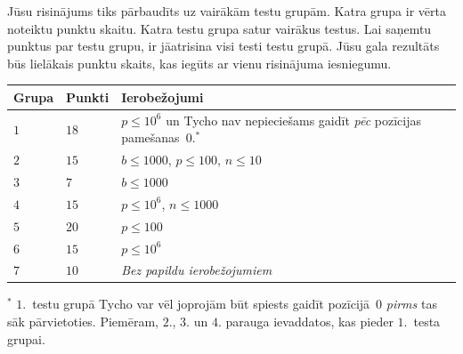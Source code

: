 Jūsu risinājums tiks pārbaudīts uz vairākām testu grupām. Katra grupa ir vērta noteiktu punktu skaitu.
Katra testu grupa satur vairākus testus.
Lai saņemtu punktus par testu grupu, ir jāatrisina visi testi testu grupā.
Jūsu gala rezultāts būs lielākais punktu skaits, kas iegūts ar vienu risinājuma iesniegumu.

\medskip
\begin{tabular}{lll}
  Grupa & Punkti & Ierobežojumi\\\hline
  $1$ & $18$  & $p\leq 10^6$ un Tycho nav nepieciešams gaidīt \emph{pēc} pozīcijas pamešanas~$0$.$^*$ \\ %
  $2$ & $15$  & $b\leq 1000$, $p\leq 100$, $n\leq 10$ \\
  $3$ & $7$  & $b\leq 1000$ \\
  $4$ & $15$ & $p\leq 10^6$, $n\leq 1000$\\
  $5$ & $20$ & $p\leq 100$\\
  $6$ & $15$ & $p\leq 10^6$\\
  $7$ & $10$ & \emph{Bez papildu ierobežojumiem}
\end{tabular}

\medskip
\noindent $^*$ $1$.~testu grupā Tycho var vēl joprojām būt spiests gaidīt pozīcijā~$0$ \emph{pirms} tas sāk pārvietoties. Piemēram, $2$., $3$. un $4$. parauga ievaddatos, kas pieder $1$.~testa grupai.
